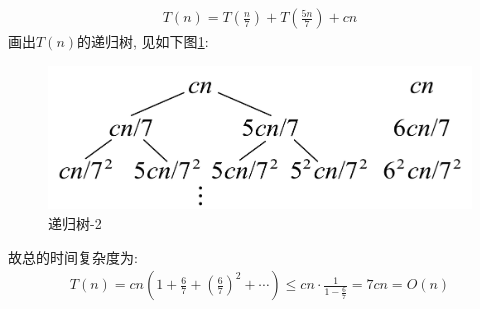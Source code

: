 \documentclass{article}
\begin{document}
\begin{homeworkProblem}
\begin{align}
		T\left( n \right) =T\left( \frac{n}{7} \right) +T\left( \frac{5n}{7} \right) +cn
	\end{align}
	画出$T(n)$的递归树, 见如下图\ref{fig:递归树-2}:
	\begin{figure}[H]  %
		\centering
		\includegraphics[width=0.4\linewidth]{images/title/递归树2.pdf}
		\caption{递归树-2}
		\label{fig:递归树-2}
	\end{figure}
	故总的时间复杂度为:
	\begin{align}
		T\left( n \right) =cn\left( 1+\frac{6}{7}+\left( \frac{6}{7} \right) ^2+\cdots \right) \le cn\cdot \frac{1}{1-\frac{6}{7}}=7cn=O\left( n \right) 
	\end{align}
\end{homeworkProblem}
\end{document}
